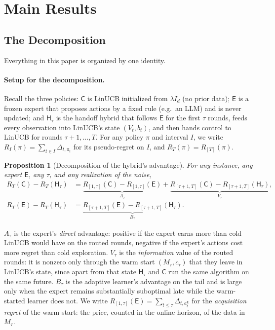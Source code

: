 \documentclass{article}
\newtheorem{proposition}{Proposition}
\theoremstyle{definition}
\theoremstyle{remark}
\theoremstyle{remark}
\newcommand{\Cold}{\mathsf{C}}
\newcommand{\Exp}{\mathsf{E}}
\newcommand{\Hyb}{\mathsf{H}}
\begin{document}
\section{Main Results}
\label{sec:main-results}

\subsection{The Decomposition}
\label{sec:catalog}

Everything in this paper is organized by one identity.

\paragraph{Setup for the decomposition.}
Recall the three policies: $\Cold$ is LinUCB initialized from $\lambda I_d$
(no prior data); $\Exp$ is a frozen expert that proposes actions by a fixed
rule (e.g.\ an LLM) and is never updated; and $\Hyb_\tau$ is the handoff
hybrid that follows $\Exp$ for the first $\tau$ rounds, feeds every
observation into LinUCB's state $(V_t,b_t)$, and then hands control to LinUCB
for rounds $\tau{+}1,\dots,T$. For any policy $\pi$ and interval $I$, we
write $R_I(\pi)=\sum_{t\in I}\Delta_{t,\pi_t}$ for its pseudo-regret on $I$,
and $R_T(\pi)=R_{[T]}(\pi)$.

\begin{proposition}[Decomposition of the hybrid's advantage]
\label{prop:decomp}
For any instance, any expert $\Exp$, any $\tau$, and any realization of the
noise,
\begin{align*}
R_T(\Cold)-R_T(\Hyb_\tau)
&=\underbrace{R_{[1,\tau]}(\Cold)-R_{[1,\tau]}(\Exp)}_{A_\tau}
 +\underbrace{R_{[\tau+1,T]}(\Cold)-R_{[\tau+1,T]}(\Hyb_\tau)}_{V_\tau},\\
R_T(\Exp)-R_T(\Hyb_\tau)
&=\underbrace{R_{[\tau+1,T]}(\Exp)-R_{[\tau+1,T]}(\Hyb_\tau)}_{B_\tau}.
\end{align*}
\end{proposition}

$A_\tau$ is the expert's \emph{direct} advantage: positive if the expert earns
more than cold LinUCB would have on the routed rounds, negative if the expert's
actions cost more regret than cold exploration. $V_\tau$ is the
\emph{information} value of the routed rounds: it is nonzero only through the
warm start $(M_\tau,c_\tau)$ that they leave in LinUCB's state, since apart
from that state $\Hyb_\tau$ and $\Cold$ run the same algorithm on the same
future. $B_\tau$ is the adaptive learner's advantage on the tail and is large
only when the expert remains substantially suboptimal late while the
warm-started learner does not. We write $R_{[1,\tau]}(\Exp)=\sum_{t\le\tau}\Delta_{t,a_t^{\Exp}}$
for the \emph{acquisition regret} of the warm start: the price, counted in the
online horizon, of the data in $M_\tau$.
\end{document}
